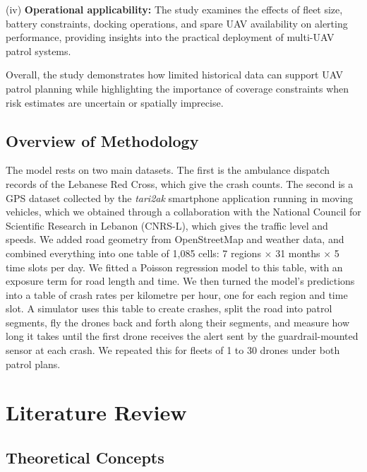 \documentclass[11pt]{article}
\begin{document}
(iv) \textbf{Operational applicability:} The study examines the effects of fleet size, battery constraints, docking operations, and spare UAV availability on alerting performance, providing insights into the practical deployment of multi-UAV patrol systems.

Overall, the study demonstrates how limited historical data can support UAV patrol planning while highlighting the importance of coverage constraints when risk estimates are uncertain or spatially imprecise.

\subsection{Overview of Methodology}

The model rests on two main datasets. The first is the ambulance dispatch
records of the Lebanese Red Cross, which give the crash counts. The second is a
GPS dataset collected by the \emph{tari2ak} smartphone application running in
moving vehicles, which we obtained through a collaboration with the National
Council for Scientific Research in Lebanon (CNRS-L), which gives the traffic level and speeds. We added road
geometry from OpenStreetMap and weather data, and combined everything into one
table of 1{,}085 cells: 7 regions $\times$ 31 months $\times$ 5 time slots per
day. We fitted a Poisson regression model to this table, with an exposure term
for road length and time. We then turned the model's predictions into a table
of crash rates per kilometre per hour, one for each region and time slot. A
simulator uses this table to create crashes, split the road into patrol
segments, fly the drones back and forth along their segments, and measure how
long it takes until the first drone receives the alert sent by the
guardrail-mounted sensor at each crash. We repeated this for fleets of 1 to 30
drones under both patrol plans.

\section{Literature Review}

\subsection{Theoretical Concepts}
\end{document}
